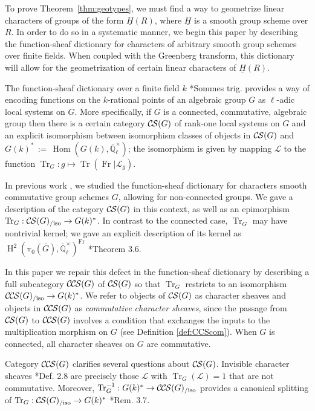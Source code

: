 \documentclass[10pt]{amsart}
\theoremstyle{plain}
\theoremstyle{definition}
\newcommand{\EE}{\mathbb{\bar Q}_\ell}
\newcommand{\EEx}{\EE^\times}
\newcommand{\Frob}[1]{\operatorname{Fr}_{#1}}
\DeclareMathOperator{\Hom}{Hom}
\DeclareMathOperator{\Hh}{H}
\newcommand{\ceq}{{\, :=\, }}
\DeclareMathOperator{\Tr}{Tr}
\newcommand{\TrFrob}[1]{\Tr_{#1}}
\newcommand{\cs}[1]{{\mathcal{#1}}}
\newcommand{\CS}{{\mathcal{C\hskip-0.8pt S}}}
\newcommand{\CCS}{{\mathcal{C\hskip-.8pt C\hskip-0.8pt S}}}
\newcommand{\CSiso}[1]{\CS(#1)_{/\text{iso}}}
\newcommand{\CCSiso}[1]{\CCS(#1)_{/\text{iso}}}
\newcommand{\bG}{\bar{G}}
\begin{document}
To prove Theorem~\ref{thm:geotypes}, we must find a way to geometrize linear characters of groups of the form $\underline{H}(R)$, where $\underline{H}$ is a smooth group scheme over $R$. 
In order to do so in a systematic manner, we begin this paper by describing the function-sheaf dictionary for characters of arbitrary smooth group schemes over finite fields. 
When coupled with the Greenberg transform, this dictionary will allow for the geometrization of certain linear characters of $\underline{H}(R)$.

The function-sheaf dictionary over a finite field $k$ \cite{deligne:SGA4.5}*{Sommes trig.}
provides a way of encoding functions on the $k$-rational points of an algebraic group $G$
as $\ell$-adic local systems on $G$.  More specifically, if $G$ is a connected, commutative, algebraic group
then there is a certain category $\CS(G)$ of rank-one local systems on $G$ and an
explicit isomorphism between isomorphism classes
of objects in $\CS(G)$ and $G(k)^* \ceq \Hom(G(k), \EEx)$; 
the isomorphism is given by mapping $\cs{L}$ to the function
$\TrFrob{G} : g \mapsto \Tr(\Frob{} \vert \cs{L}_g)$.

In previous work \cite{cunningham-roe:13a}, we studied the function-sheaf dictionary for characters
smooth commutative group schemes $G$, allowing for non-connected groups.
We gave a description of the category $\CS(G)$ in this context, as well
as an epimorphism $\TrFrob{G} : \CSiso{G} \to G(k)^*$.
In contrast to the connected case, $\TrFrob{G}$ may have nontrivial kernel;
we gave an explicit description of its kernel as $\Hh^2(\pi_0(\bG), \EEx)^{\Frob{}}$ \cite{cunningham-roe:13a}*{Theorem 3.6}.  

In this paper we repair this defect in the function-sheaf dictionary
 by describing a full subcategory $\CCS(G)$ of $\CS(G)$ so that $\TrFrob{G}$ restricts to an isomorphism $\CCSiso{G} \to G(k)^*$.
We refer to objects of $\CS(G)$ as character sheaves and objects in $\CCS(G)$ as \emph{commutative character sheaves}, since the passage from $\CS(G)$ to $\CCS(G)$ involves a condition that exchanges the inputs to the multiplication morphism on $G$ (see Definition \ref{def:CCScom}).  
When $G$ is connected, all character sheaves on $G$ are commutative.

Category $\CCS(G)$ clarifies several questions about $\CS(G)$. 
Invisible character sheaves \cite{cunningham-roe:13a}*{Def. 2.8} are precisely those $\cs{L}$ with $\TrFrob{G}(\cs{L}) = 1$ that are not commutative.  Moreover, $\TrFrob{G}^{-1} : G(k)^* \to \CCSiso{G}$ provides a canonical splitting of $\TrFrob{G} : \CSiso{G} \to G(k)^*$ \cite{cunningham-roe:13a}*{Rem. 3.7}.
\end{document}
